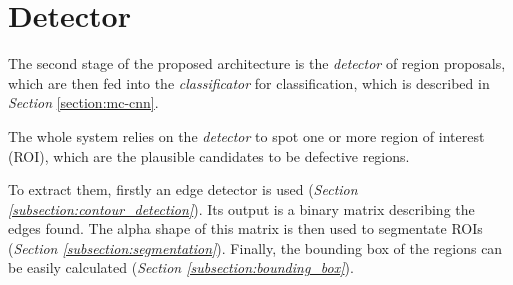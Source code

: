\section{Detector}\label{section:region_proposals}
    \par{
        The second stage of the proposed architecture is the \emph{detector} of region proposals, which are then fed into the \emph{classificator} for classification, which is described in \emph{Section} \ref{section:mc-cnn}.
    }
    \par{
        The whole system relies on the \emph{detector} to spot one or more region of interest (ROI), which are the plausible candidates to be defective regions.
    }
    \par{
        To extract them, firstly an edge detector is used (\emph{Section \ref{subsection:contour_detection}}). Its output is a binary matrix describing the edges found. The alpha shape of this matrix is then used to segmentate ROIs (\emph{Section \ref{subsection:segmentation}}). Finally, the bounding box of the regions can be easily calculated (\emph{Section \ref{subsection:bounding_box}}).
    }
